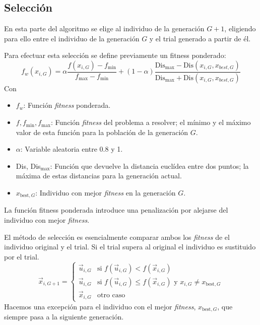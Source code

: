 \documentclass{article}
\begin{document}
\subsection{Selección}
En esta parte del algoritmo se elige al individuo de la generación $G+1$, eligiendo para ello entre el individuo de la generación $G$ y el trial generado a partir de él.

Para efectuar esta selección se define previamente un fitness ponderado:
\begin{equation}
    f_w(x_{i,G}) = \alpha\frac{f(x_{i,G}) - f_\text{min}}{f_\text{max} - f_\text{min}} + (1-\alpha)\frac{\text{Dis}_\text{max} - \text{Dis}(x_{i,G}, x_{best,G})}{\text{Dis}_\text{max} + \text{Dis}(x_{i,G}, x_{best,G})}
    \label{ec_fitness_ponderado}
\end{equation}
Con
\begin{itemize}
    \item $f_w$: Función \textit{fitness} ponderada.
    \item $f, f_\text{min}, f_\text{max}$: Función \textit{fitness} del problema a resolver; el mínimo y el máximo valor de esta función para la población de la generación $G$.
    \item $\alpha$: Variable aleatoria entre 0.8 y 1.
    \item Dis, Dis$_\text{max}$: Función que devuelve la distancia euclídea entre dos puntos; la máxima de estas distancias para la generación actual.
    \item $x_{\text{best}, G}$: Individuo con mejor \textit{fitness} en la generación $G$.
\end{itemize}
La función fitness ponderada introduce una penalización por alejarse del individuo con mejor \textit{fitness}.

El método de selección es esencialmente comparar ambos los \textit{fitness} de el individuo original y el trial. Si el trial supera al original el individuo es sustituido por el trial.
\begin{equation}
    \vec{x}_{i,G+1} = \left\{\begin{array}{cl}
            \vec{u}_{i,G}&\text{si }f(\vec{u}_{i,G})<f(\vec{x}_{i,G})\\
            \vec{u}_{i,G}&\text{si }f(\vec{u}_{i,G})\le f(\vec{x}_{i,G})\text{ y }x_{i, G}\neq x_{\text{best}, G}\\
            \vec{x}_{i,G}&\text{otro caso}
        \end{array}\right.
\label{ec_seleccion}
\end{equation}
Hacemos una excepción para el individuo con el mejor \textit{fitness}, $x_{\text{best},G}$, que siempre pasa a la siguiente generación.
\end{document}
